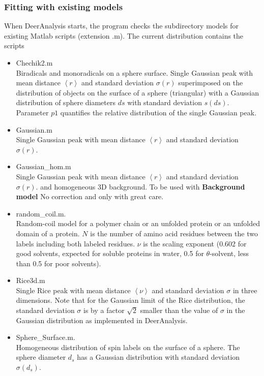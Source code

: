 \documentclass{article}
\begin{document}
\subsubsection{Fitting with existing models}
\label{fit_existing}
When DeerAnalysis starts, the program checks the subdirectory {\ttfamily models} for existing Matlab scripts (extension {\ttfamily .m}). The current distribution contains the scripts 
\begin{itemize}
	\item {\ttfamily Chechik2.m} \\ Biradicals and monoradicals on a sphere surface. Single Gaussian peak with mean distance $\left\langle r \right\rangle$ and standard deviation $\sigma(r)$ superimposed on the distribution of objects on the surface of a sphere (triangular) with a Gaussian distribution of sphere diameters $ds$ with standard deviation $s(ds)$. Parameter $p1$ quantifies the relative distribution of the single Gaussian peak.
	\item {\ttfamily Gaussian.m} \\ Single Gaussian peak with mean distance $\left\langle r \right\rangle$ and standard deviation $\sigma(r)$.
	\item {\ttfamily Gaussian\_hom.m} \\ Single Gaussian peak with mean distance $\left\langle r \right\rangle$ and standard deviation $\sigma(r)$. and homogeneous 3D background. To be used with {\bf Background model} {\ttfamily No correction} and only with great care.
	\item {\ttfamily random\_coil.m}. \\ Random-coil model for a polymer chain or an unfolded protein or an unfolded domain of a protein. $N$ is the number of amino acid residues between the two labels including both labeled
 residues. $\nu$ is the scaling exponent (0.602 for good solvents, expected for soluble proteins in water, 0.5 for $\theta$-solvent, less than 0.5 for poor solvents).
 	\item {\ttfamily Rice3d.m} \\ Single Rice peak \cite{koehler2011} with mean distance $\left\langle \nu\right\rangle$ and standard deviation $\sigma$ in three dimensions. Note that for the Gaussian limit of the Rice distribution, the standard deviation $\sigma$ is by a factor $\sqrt{2}$ smaller than the value of $\sigma$ in the Gaussian distribution as implemented in DeerAnalysis.
\item {\ttfamily Sphere\_Surface.m}. \\ Homogeneous distribution of spin labels on the surface of a sphere. The sphere diameter $d_s$ has a Gaussian distribution with standard deviation $\sigma(d_s)$. 

\end{itemize}
\end{document}
